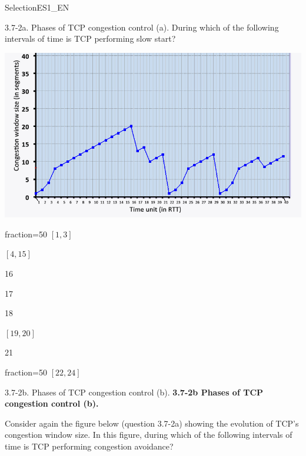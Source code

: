 \documentclass[a4paper]{article}
\begin{document}
\begin{quiz}{SelectionES1\_EN}
\begin{multi}[points=1,shuffle,multiple]{3.7-2a. Phases of TCP congestion control (a).}
During which of the following intervals of time is TCP performing slow start?
\begin{center}
\includegraphics[width=\linewidth]{figs/tcp_cc_evolution.jpg}
\end{center}

\item[fraction=50] $[1,3]$
\item $[4,15]$
\item 16
\item 17
\item 18
\item $[19,20]$
\item 21
\item[fraction=50] $[22,24]$
\end{multi}

\begin{multi}[points=1,shuffle,multiple]{3.7-2b. Phases of TCP congestion control (b).}
\textbf{3.7-2b Phases of TCP congestion control (b).} 

Consider again the figure below (question 3.7-2a) showing the evolution of TCP's congestion window size. In this figure, during which of the following intervals of time is TCP performing congestion avoidance?


\end{multi}
\end{quiz}
\end{document}
